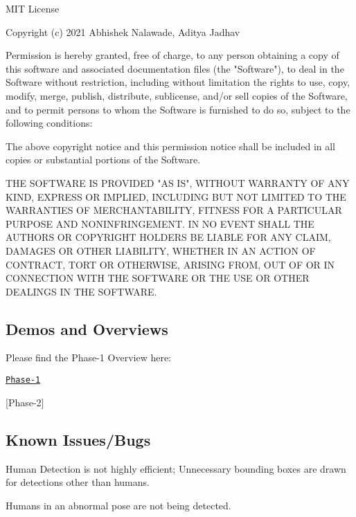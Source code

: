 \begin{DoxyCode}
MIT License

Copyright (c) 2021 Abhishek Nalawade, Aditya Jadhav

Permission is hereby granted, free of charge, to any person obtaining a copy
of this software and associated documentation files (the "Software"), to deal
in the Software without restriction, including without limitation the rights
to use, copy, modify, merge, publish, distribute, sublicense, and/or sell
copies of the Software, and to permit persons to whom the Software is
furnished to do so, subject to the following conditions:

The above copyright notice and this permission notice shall be included in all
copies or substantial portions of the Software.

THE SOFTWARE IS PROVIDED "AS IS", WITHOUT WARRANTY OF ANY KIND, EXPRESS OR
IMPLIED, INCLUDING BUT NOT LIMITED TO THE WARRANTIES OF MERCHANTABILITY,
FITNESS FOR A PARTICULAR PURPOSE AND NONINFRINGEMENT. IN NO EVENT SHALL THE
AUTHORS OR COPYRIGHT HOLDERS BE LIABLE FOR ANY CLAIM, DAMAGES OR OTHER
LIABILITY, WHETHER IN AN ACTION OF CONTRACT, TORT OR OTHERWISE, ARISING FROM,
OUT OF OR IN CONNECTION WITH THE SOFTWARE OR THE USE OR OTHER DEALINGS IN THE 
SOFTWARE.
\end{DoxyCode}


\subsection*{Demos and Overviews}

Please find the Phase-\/1 Overview here\+:
\begin{DoxyItemize}
\item \href{https://youtu.be/lwNjuT5e-FM}{\tt Phase-\/1}
\item \mbox{[}Phase-\/2\mbox{]}
\end{DoxyItemize}

\subsection*{Known Issues/\+Bugs}


\begin{DoxyItemize}
\item Human Detection is not highly efficient; Unnecessary bounding boxes are drawn for detections other than humans.
\item Humans in an abnormal pose are not being detected.
\end{DoxyItemize}

